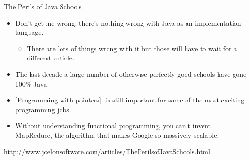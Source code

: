 \begin{frame}[t]{The Perils of Java Schools}
  \begin{itemize}
    \item Don't get me wrong: there's nothing wrong with Java as an implementation language.
      \begin{itemize}
        \item There are lots of things wrong with it but those will have to wait for a different article.
      \end{itemize}
    \item The last decade a large number of otherwise perfectly good schools have gone 100\% Java
    \item {[Programming with pointers]}\ldots is still important for some of the most exciting programming jobs.
    \item Without understanding functional programming, you can't invent MapReduce, the algorithm that makes Google so massively scalable.
  \end{itemize}
  {\tiny
  \url{http://www.joelonsoftware.com/articles/ThePerilsofJavaSchools.html}}
\end{frame}
